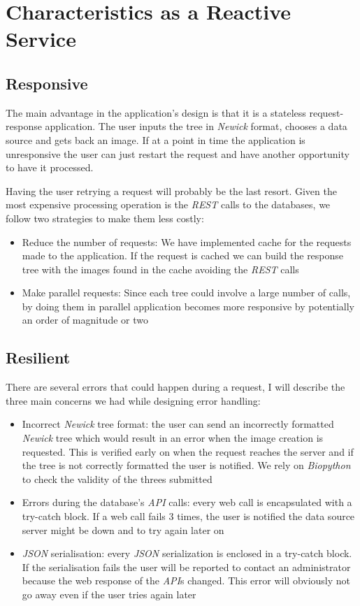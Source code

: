\documentclass[10pt]{article}
\begin{document}
\section{Characteristics as a Reactive Service}
 \subsection{Responsive}
 	The main advantage in the application's design is that it is a stateless request-response application. The user inputs the tree in \textit{Newick} format, chooses a data source and gets back an image. If at a point in time the application is unresponsive the user can just restart the request and have another opportunity to have it processed.
 	
 	Having the user retrying a request will probably be the last resort. Given the most expensive processing operation is the \textit{REST} calls to the databases, we follow two strategies to make them less costly:
 	
 	\begin{itemize}
  		\item Reduce the number of requests: We have implemented cache for the requests made to the application. If the request is cached we can build the response tree with the images found in the cache avoiding the \textit{REST} calls
  		\item Make parallel requests: Since each tree could involve a large number of calls, by doing them in parallel application becomes more responsive by potentially an order of magnitude or two
	\end{itemize}
 	
 \subsection{Resilient}
 	There are several errors that could happen during a request, I will describe the three main concerns we had while designing error handling:
 	
 	\begin{itemize}
  		\item Incorrect \textit{Newick} tree format: the user can send an incorrectly formatted \textit{Newick} tree which would result in an error when the image creation is requested. This is verified early on when the request reaches the server and if the tree is not correctly formatted the user is notified. We rely on \textit{Biopython} to check the validity of the threes submitted
  		\item Errors during the database's \textit{API} calls: every web call is encapsulated with a try-catch block. If a web call fails 3 times, the user is notified the data source server might be down and to try again later on
  		\item \textit{JSON} serialisation: every \textit{JSON} serialization is enclosed in a try-catch block. If the serialisation fails the user will be reported to contact an administrator because the web response of the \textit{API}s changed. This error will obviously not go away even if the user tries again later
	\end{itemize}
 	
\end{document}
